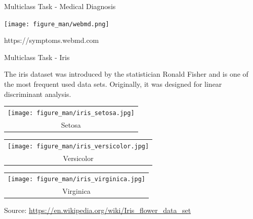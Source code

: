 \documentclass[11pt,compress,t,notes=noshow, xcolor=table]{beamer}
\begin{document}
\begin{vbframe}{Multiclass Task - Medical Diagnosis}
\begin{center}
  \texttt{[image: figure\_man/webmd.png]}
\end{center}
\vspace{-0.5cm}
\begin{flushright}
  \tiny https://symptoms.webmd.com
\end{flushright}
\end{vbframe}

\begin{vbframe}{Multiclass Task - Iris}

The iris dataset was introduced by the statistician Ronald Fisher and is one
of the most frequent used data sets. Originally, it was designed for linear
discriminant analysis.

\begin{center}
\parbox{0.3\textwidth}{
\centering
  \begin{tabular}{@{}c@{}}
    \texttt{[image: figure\_man/iris\_setosa.jpg]} \\[\abovecaptionskip]
    \small Setosa
  \end{tabular}
}
\parbox{0.3\textwidth}{
\centering
  \begin{tabular}{@{}c@{}}
    \texttt{[image: figure\_man/iris\_versicolor.jpg]} \\[\abovecaptionskip]
    \small Versicolor
  \end{tabular}
}
\parbox{0.3\textwidth}{
\centering
  \begin{tabular}{@{}c@{}}
    \texttt{[image: figure\_man/iris\_virginica.jpg]} \\[\abovecaptionskip]
    \small Virginica
  \end{tabular}
}
\end{center}
  Source: \url{https://en.wikipedia.org/wiki/Iris\_flower\_data\_set}
\end{vbframe}
\end{document}
